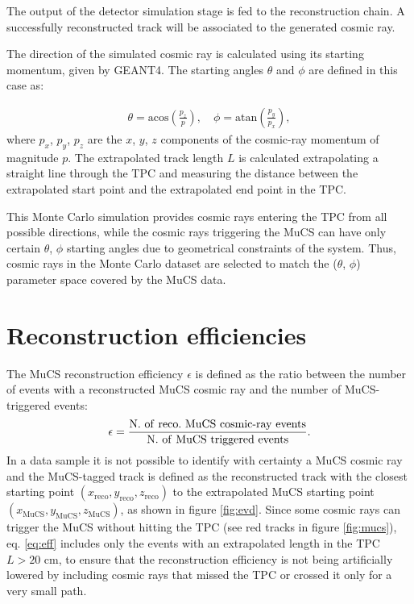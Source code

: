 \documentclass[a4paper,11pt]{article}
\def\myhyphen{{\hbox{-}}}
\begin{document}
The output of the detector simulation stage is fed to the reconstruction chain. A successfully reconstructed track will be associated to the generated cosmic ray.

The direction of the simulated cosmic ray is calculated using its starting momentum, given by GEANT4. The starting angles $\theta$ and $\phi$ are defined in this case as:

\begin{align}\label{eq:angles}
  \theta = \mathrm{acos}\left(\frac{p_{z}}{p}\right), \quad
  \phi = \mathrm{atan}\left(\frac{p_{y}}{p_{x}}\right),
\end{align}
where $p_{x}$, $p_{y}$, $p_{z}$ are the $x$, $y$, $z$ components of the cosmic-ray momentum of magnitude $p$.
The extrapolated track length $L$ is calculated extrapolating a straight line through the TPC and measuring the distance between the extrapolated start point and the extrapolated end point in the TPC.

This Monte Carlo simulation provides cosmic rays entering the TPC from all possible directions, while the cosmic rays triggering the MuCS can have only certain $\theta$, $\phi$ starting angles due to geometrical constraints of the system. Thus, cosmic rays in the Monte Carlo dataset are selected to match the ($\theta$, $\phi$) parameter space covered by the MuCS data.


\section{Reconstruction efficiencies}\label{sec:reco}

The MuCS reconstruction efficiency $\epsilon$ is defined as the ratio between the number of events with a reconstructed MuCS cosmic ray and the number of MuCS-triggered events:
\begin{equation}\label{eq:eff}
  \epsilon = \frac{\mathrm{N.~of~reco.~MuCS~cosmic\myhyphen ray~events}}{\mathrm{N.~of~MuCS~triggered~events}}.
\end{equation}
In a data sample it is not possible to identify with certainty a MuCS cosmic ray and the MuCS-tagged track is defined as the reconstructed track with the closest starting point $(x_{\mathrm{reco}},y_{\mathrm{reco}},z_{\mathrm{reco}})$ to the extrapolated MuCS starting point $(x_{\mathrm{MuCS}},y_{\mathrm{MuCS}},z_{\mathrm{MuCS}})$, as shown in figure \ref{fig:evd}. Since some cosmic rays can trigger the MuCS without hitting the TPC (see red tracks in figure \ref{fig:mucs}), eq. \eqref{eq:eff} includes only the events with an extrapolated length in the TPC $L > 20$ cm, to ensure that the reconstruction efficiency is not being artificially lowered by including cosmic rays that missed the TPC or crossed it only for a very small path.
\end{document}
